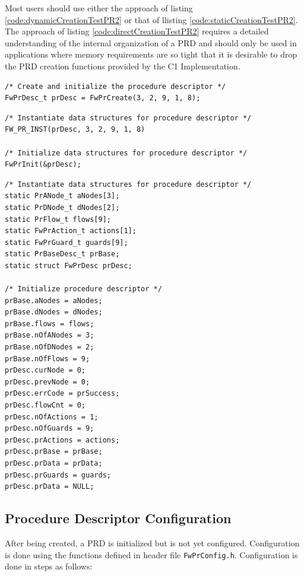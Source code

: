 \documentclass[manual]{../fwprofile}
\begin{document}
Most users should use either the approach of listing \ref{code:dynamicCreationTestPR2} or that of llisting
\ref{code:staticCreationTestPR2}. The approach of listing \ref{code:directCreationTestPR2} 
requires a detailed understanding of the internal organization of a PRD and should only be used in 
applications where memory requirements are so tight that it is desirable to drop the PRD creation 
functions provided by the C1 Implementation.

\begin{lstlisting}
/* Create and initialize the procedure descriptor */
FwPrDesc_t prDesc = FwPrCreate(3, 2, 9, 1, 8);
\end{lstlisting}

\begin{lstlisting}
/* Instantiate data structures for procedure descriptor */
FW_PR_INST(prDesc, 3, 2, 9, 1, 8)

/* Initialize data structures for procedure descriptor */
FwPrInit(&prDesc);
\end{lstlisting}

\begin{lstlisting}
/* Instantiate data structures for procedure descriptor */
static PrANode_t aNodes[3];	        
static PrDNode_t dNodes[2]; 	        
static PrFlow_t flows[9];	        
static FwPrAction_t actions[1]; 
static FwPrGuard_t guards[9];	
static PrBaseDesc_t prBase;
static struct FwPrDesc prDesc;

/* Initialize procedure descriptor */
prBase.aNodes = aNodes;
prBase.dNodes = dNodes;
prBase.flows = flows;
prBase.nOfANodes = 3;
prBase.nOfDNodes = 2;
prBase.nOfFlows = 9;
prDesc.curNode = 0;
prDesc.prevNode = 0;
prDesc.errCode = prSuccess;
prDesc.flowCnt = 0;
prDesc.nOfActions = 1;
prDesc.nOfGuards = 9;
prDesc.prActions = actions;
prDesc.prBase = prBase;
prDesc.prData = prData;
prDesc.prGuards = guards;
prDesc.prData = NULL;
\end{lstlisting}

\subsection{Procedure Descriptor Configuration}\label{sec:prConfig}
After being created, a PRD is initialized but is not yet configured. Configuration is done using the functions defined 
in header file \texttt{FwPrConfig.h}. Configuration is done in steps as follows:
\end{document}
